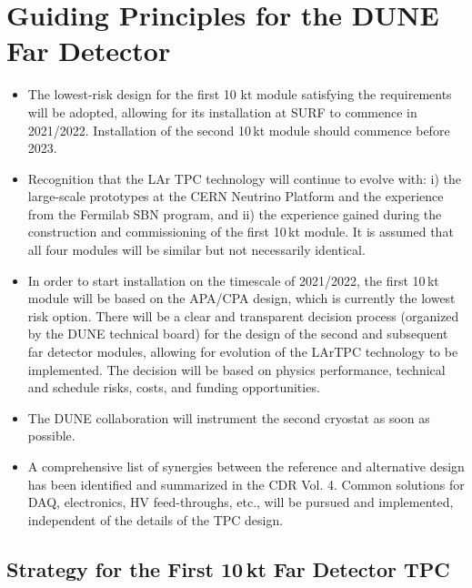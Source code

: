 \section{Guiding Principles for the DUNE Far Detector}

\begin{itemize}
\item The lowest-risk design for the first 10 kt module satisfying the requirements 
will be adopted, allowing for its installation at SURF to commence in 2021/2022. Installation 
of the second 10\,kt module should commence before 2023.

\item  Recognition that the LAr TPC technology will continue to evolve with: i) the 
large-scale prototypes at the CERN Neutrino Platform and the experience from the 
Fermilab SBN program, and ii) the experience gained during the construction and 
commissioning of the first 10\,kt module. It is assumed that all four modules 
will be similar but not necessarily identical.

\item  In order to start installation on the timescale of 2021/2022, the first 
10\,kt module will be based on the APA/CPA design, which is currently the lowest
risk option. There will be a clear and transparent decision process (organized by the DUNE 
technical board) for the design 
of the second and subsequent far detector modules, allowing for evolution of the 
LArTPC technology to be implemented. The decision will be 
based on physics performance, technical and schedule risks, costs, and funding 
opportunities.

\item The DUNE collaboration will instrument the second cryostat as soon as possible.

\item A comprehensive list of synergies between the reference and alternative design 
has been identified and summarized in the CDR Vol. 4. Common solutions for DAQ, 
electronics, HV feed-throughs, etc., will be pursued and implemented, independent 
of the details of the TPC design.

\end{itemize}

\subsection{Strategy for the First 10\,kt Far Detector TPC}



